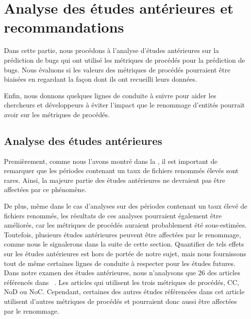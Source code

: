 \section{Analyse des études antérieures et recommandations}
\label{sec:analyse}

Dans cette partie, nous procédons à l’analyse d’études antérieures sur la prédiction de bugs qui ont utilisé les métriques de procédés pour la prédiction de bugs. Nous évaluons si les valeurs des métriques de procédés pourraient être biaisées en regardant la façon dont ils ont recueilli leurs données.

Enfin, nous donnons quelques lignes de conduite à suivre pour aider les chercheurs et développeurs à éviter l’impact que le renommage d’entités pourrait avoir sur les métriques de procédés.  

\subsection{Analyse des études antérieures}

Premièrement, comme nous l'avons montré dans la , il est important de remarquer que les périodes contenant un taux de fichiers renommés élevés sont rares. Ainsi, la majeure partie des études antérieures ne devraient pas être affectées par ce phénomène. 

De plus, même dans le cas d'analyses sur des périodes contenant un taux élevé de fichiers renommés, les résultats de ces analyses pourraient également être améliorés, car les métriques de procédés auraient probablement été sous-estimées. Toutefois, plusieurs études antérieures peuvent être affectées par le renommage, comme nous le signalerons dans la suite de cette section. Quantifier de tels effets sur les études antérieures est hors de portée de notre sujet, mais nous fournissons tout de même certaines lignes de conduite à respecter pour les études futures.\\

Dans notre examen des études antérieures, nous n'analysons que $26$ des articles référencés dans ~\cite{radjenovic_software_2013}. Les articles qui utilisent les trois métriques de procédés, CC, NoD ou NoC. Cependant, certaines des autres études référencées dans cet article utilisent d'autres métriques de procédés et pourraient donc aussi être affectées par le renommage.\\

